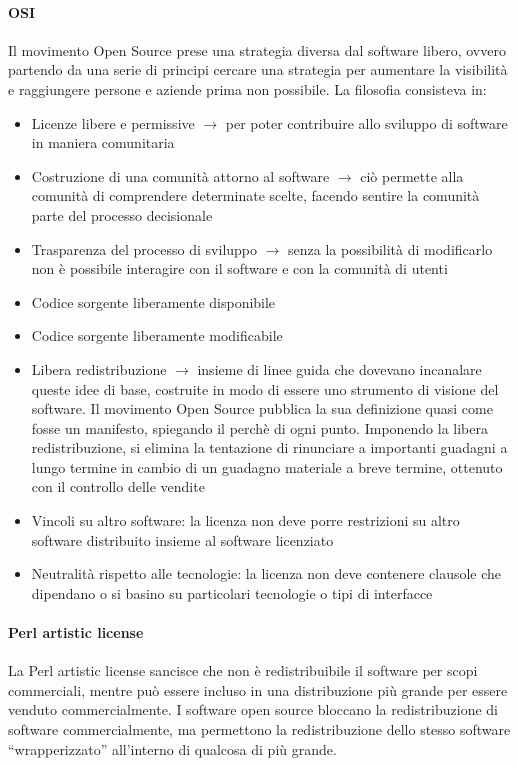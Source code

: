 \paragraph*{OSI} Il movimento Open Source prese una strategia diversa dal software libero, ovvero partendo da una serie di principi cercare una strategia per aumentare la visibilit\`a e raggiungere persone e aziende prima non possibile. La filosofia consisteva in:
\begin{itemize}

\item Licenze libere e permissive $\to$ per poter contribuire allo sviluppo di software in maniera comunitaria
\item Costruzione di una comunit\`a attorno al software $\to$ ci\`o permette alla comunit\`a di comprendere determinate scelte, facendo sentire la comunit\`a parte del processo decisionale
\item Trasparenza del processo di sviluppo $\to$ senza la possibilit\`a di modificarlo non \`e possibile interagire con il software e con la comunit\`a di utenti
\item Codice sorgente liberamente disponibile
\item Codice sorgente liberamente modificabile
\item Libera redistribuzione $\to$ insieme di linee guida che dovevano incanalare queste idee di base, costruite in modo di essere uno strumento di visione del software. Il movimento Open Source pubblica la sua definizione quasi come fosse un manifesto, spiegando il perch\`e di ogni punto. Imponendo la libera redistribuzione, si elimina la tentazione di rinunciare a importanti guadagni a lungo termine in cambio di un guadagno materiale a breve termine, ottenuto con il controllo delle vendite
\item Vincoli su altro software: la licenza non deve porre restrizioni su altro software distribuito insieme al software licenziato
\item Neutralit\`a rispetto alle tecnologie: la licenza non deve contenere clausole che dipendano o si basino su particolari tecnologie o tipi di interfacce

\end{itemize}

\paragraph*{Perl artistic license} La Perl artistic license sancisce che non \`e redistribuibile il software per scopi commerciali, mentre pu\`o essere incluso in una distribuzione pi\`u grande per essere venduto commercialmente. I software open source bloccano la redistribuzione di software commercialmente, ma permettono la redistribuzione dello stesso software ``wrapperizzato'' all'interno di qualcosa di pi\`u grande.

